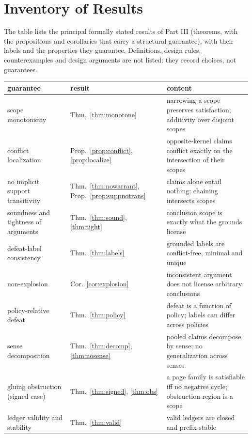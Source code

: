 \chapter{Inventory of Results}\label{app:inventory}

The table lists the principal formally stated results of Part III (theorems, with the propositions and corollaries that carry a structural guarantee), with their labels and the properties they guarantee. Definitions, design rules, counterexamples and design arguments are not listed: they record choices, not guarantees.

{\small
\begin{longtable}{@{}>{\raggedright\arraybackslash}p{} >{\raggedright\arraybackslash}p{} >{\raggedright\arraybackslash}p{}@{}}
\toprule
guarantee & result & content\\
\midrule
\endhead
scope monotonicity & Thm.~\ref{thm:monotone} & narrowing a scope preserves satisfaction; additivity over disjoint scopes\\
conflict localization & Prop.~\ref{prop:conflict}, \ref{prop:localize} & opposite-kernel claims conflict exactly on the intersection of their scopes\\
no implicit support transitivity & Thm.~\ref{thm:nowarrant}, Prop.~\ref{prop:suppnotrans} & claims alone entail nothing; chaining intersects scopes\\
soundness and tightness of arguments & Thm.~\ref{thm:sound}, \ref{thm:tight} & conclusion scope is exactly what the grounds license\\
defeat-label consistency & Thm.~\ref{thm:labels} & grounded labels are conflict-free, minimal and unique\\
non-explosion & Cor.~\ref{cor:explosion} & inconsistent argument does not license arbitrary conclusions\\
policy-relative defeat & Thm.~\ref{thm:policy} & defeat is a function of policy; labels can differ across policies\\
sense decomposition & Thm.~\ref{thm:decomp}, \ref{thm:nosense} & pooled claims decompose by sense; no generalization across senses\\
gluing obstruction (signed case) & Thm.~\ref{thm:signed}, \ref{thm:obs} & a page family is satisfiable iff no negative cycle; obstruction region is a scope\\
ledger validity and stability & Thm.~\ref{thm:valid} & valid ledgers are closed and prefix-stable\\

\end{longtable}}
